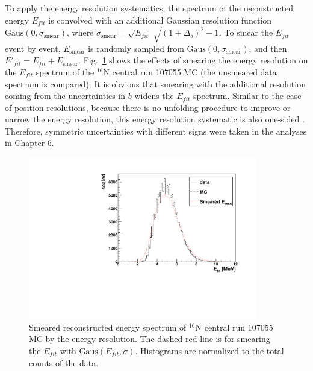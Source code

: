To apply the energy resolution systematics, the spectrum of the reconstructed energy $E_{fit}$ is convolved with an additional Gaussian resolution function $\mathrm{Gaus}(0,\sigma_\mathrm{smear})$, where $\sigma_\mathrm{smear}=\sqrt{E_{fit}} \; \sqrt{(1+\Delta_{b})^2-1}$. To smear the $E_{fit}$ event by event, $E_\mathrm{smear}$ is randomly sampled from $\mathrm{Gaus}(0,\sigma_\mathrm{smear})$, and then $E'_{fit}=E_{fit}+E_\mathrm{smear}$. Fig.~\ref{fig:EresolSmear} shows the effects of smearing the energy resolution on the $E_{fit}$ spectrum of the $^{16}$N central run 107055 MC (the unsmeared data spectrum is compared). It is obvious that smearing with the additional resolution coming from the uncertainties in $b$ widens the $E_{fit}$ spectrum. Similar to the case of position resolutions, because there is no unfolding procedure to improve or narrow the energy resolution, this energy resolution systematic is also one-sided \cite{marzec2019measurement}. Therefore, symmetric uncertainties with different signs were taken in the analyses in Chapter 6.
\begin{figure}
	\centering
	\includegraphics[width=10cm]{SmearedEresol_N16_new.pdf}
	\caption[Smeared reconstructed energy spectrum of $^{16}$N central run 107055 MC by the energy resolution.]{Smeared reconstructed energy spectrum of $^{16}$N central run 107055 MC by the energy resolution. The dashed red line is for smearing the $E_{fit}$ with $\mathrm{Gaus}(E_{fit},\sigma)$. Histograms are normalized to the total counts of the data.\label{fig:EresolSmear}}
\end{figure}

